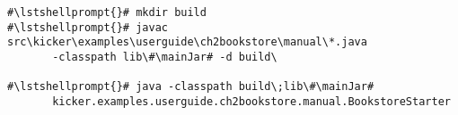 \begin{lstlisting}[caption=Commands to compile and run the instrumented Bookstore under Windows,label=lst:bookstoreStarterWin]
#\lstshellprompt{}# mkdir build
#\lstshellprompt{}# javac src\kicker\examples\userguide\ch2bookstore\manual\*.java  
       -classpath lib\#\mainJar# -d build\

#\lstshellprompt{}# java -classpath build\;lib\#\mainJar#
       kicker.examples.userguide.ch2bookstore.manual.BookstoreStarter
\end{lstlisting}